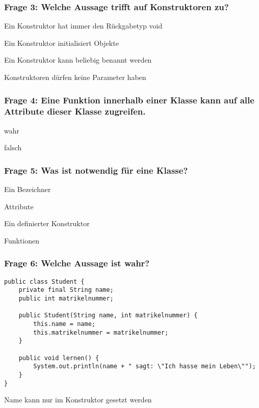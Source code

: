 \documentclass{../../presentation}
\begin{document}
\begin{frame}[fragile]
	\frametitle{Frage 3: Welche Aussage trifft auf Konstruktoren zu?}
	\begin{ausgabe}
		Ein Konstruktor hat immer den Rückgabetyp void
	\end{ausgabe}
	\begin{ausgabe}
		\textcolor<2->{green!100!black}{Ein Konstruktor initialisiert Objekte}
	\end{ausgabe}
	\begin{ausgabe}
		Ein Konstruktor kann beliebig benannt werden
	\end{ausgabe}
	\begin{ausgabe}
		Konstruktoren dürfen keine Parameter haben
	\end{ausgabe}
\end{frame}

\begin{frame}[fragile]
    \frametitle{Frage 4: Eine Funktion innerhalb einer Klasse kann auf alle Attribute dieser Klasse zugreifen.}

    \begin{ausgabe}
        \textcolor<2->{green!100!black}{wahr}
    \end{ausgabe}

    \begin{ausgabe}
        falsch
    \end{ausgabe}
\end{frame}

\begin{frame}[fragile]
	\frametitle{Frage 5: Was ist notwendig für eine Klasse?}
	\begin{ausgabe}
		\textcolor<2->{green!100!black}{Ein Bezeichner}
	\end{ausgabe}
	\begin{ausgabe}
		Attribute
	\end{ausgabe}
	\begin{ausgabe}
		Ein definierter Konstruktor
	\end{ausgabe}
	\begin{ausgabe}
		Funktionen
	\end{ausgabe}
\end{frame}

\begin{frame}[fragile]
	\frametitle{Frage 6: Welche Aussage ist wahr?}
	\begin{verbatim}
public class Student {
    private final String name;
    public int matrikelnummer;

    public Student(String name, int matrikelnummer) {
        this.name = name;
        this.matrikelnummer = matrikelnummer;
    }

    public void lernen() {
        System.out.println(name + " sagt: \"Ich hasse mein Leben\"");
    }
}
	\end{verbatim}
	\begin{ausgabe}
		\textcolor{green!100!black}{Name kann nur im Konstruktor gesetzt werden}
	\end{ausgabe}
\end{frame}
\end{document}

